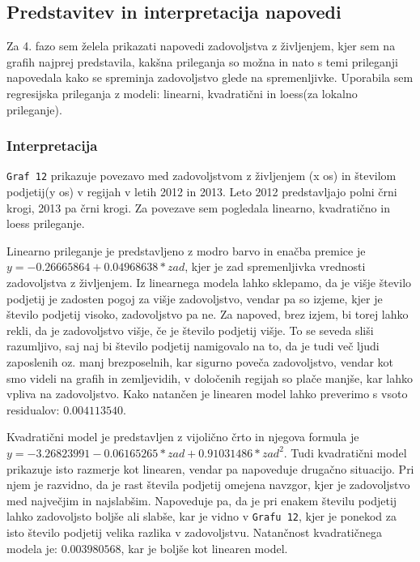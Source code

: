 \documentclass[11pt,a4paper]{article}
\begin{document}
\subsection{Predstavitev in interpretacija napovedi}
Za 4. fazo sem želela prikazati napovedi zadovoljstva z življenjem, kjer sem na grafih najprej predstavila, kakšna prileganja so možna in nato s temi prileganji napovedala kako se spreminja zadovoljstvo glede na spremenljivke. Uporabila sem regresijska prileganja z modeli: linearni, kvadratični in loess(za lokalno prileganje).

\subsubsection{Interpretacija}
\par \verb+Graf 12+ prikazuje povezavo med zadovoljstvom z življenjem (x os)  in številom podjetij(y os) v regijah v letih 2012 in 2013. Leto 2012 predstavljajo polni črni krogi, 2013 pa črni krogi. Za povezave sem pogledala linearno, kvadratično in loess prileganje.
\par Linearno prileganje je predstavljeno z modro barvo in enačba premice je $y= -0.26665864 + 0.04968638 * zad$, kjer je zad spremenljivka vrednosti zadovoljstva z življenjem. Iz linearnega modela lahko sklepamo, da je višje število podjetij je zadosten pogoj za višje zadovoljstvo, vendar pa so izjeme, kjer je število podjetij visoko, zadovoljstvo pa ne. Za napoved, brez izjem, bi torej lahko rekli, da je zadovoljstvo višje, če je število podjetij višje. To se seveda sliši razumljivo, saj naj bi število podjetij namigovalo na to, da je tudi več ljudi zaposlenih oz. manj brezposelnih, kar sigurno poveča zadovoljstvo, vendar kot smo videli na grafih in zemljevidih, v določenih regijah so plače manjše, kar lahko vpliva na zadovoljstvo. Kako natančen je linearen model lahko preverimo s vsoto residualov: $0.004113540$.

Kvadratični model je predstavljen z vijolično črto in njegova formula je $y= -3.26823991 - 0.06165265 * zad + 0.91031486 *zad^2$. Tudi kvadratični model prikazuje isto razmerje kot linearen, vendar pa napoveduje drugačno situacijo. Pri njem je razvidno, da je rast števila podjetij omejena navzgor, kjer je zadovoljstvo med največjim in najslabšim. Napoveduje pa, da je pri enakem številu podjetij lahko zadovoljsto boljše ali slabše, kar je vidno v \verb+Grafu 12+, kjer je ponekod za isto število podjetij velika razlika v zadovoljstvu. Natančnost kvadratičnega modela je: $0.003980568$, kar je boljše kot linearen model.
\end{document}
